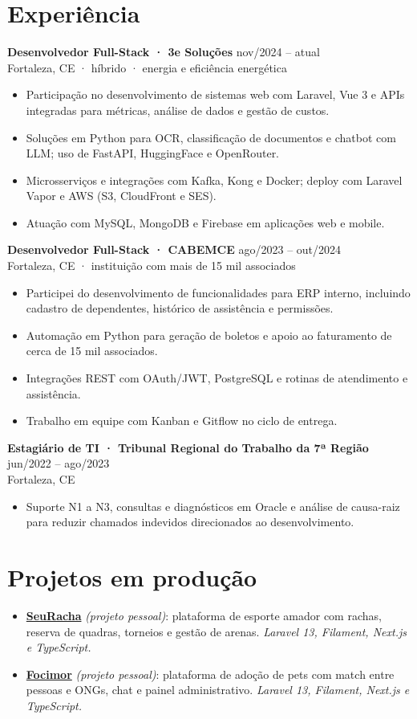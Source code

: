 \documentclass[10pt,a4paper]{article}
\newcommand{\job}[3]{\textbf{#1} \hfill {\color{muted}\small #3}\\{\color{muted}#2}\par\vspace{-2pt}}
\newcommand{\link}[2]{\href{#1}{\color{accent}#2}}
\begin{document}
\section{Experiência}
\job{Desenvolvedor Full-Stack · 3e Soluções}{Fortaleza, CE · híbrido · energia e eficiência energética}{nov/2024 -- atual}
\begin{itemize}
  \item Participação no desenvolvimento de sistemas web com Laravel, Vue 3 e APIs integradas para métricas, análise de dados e gestão de custos.
  \item Soluções em Python para OCR, classificação de documentos e chatbot com LLM; uso de FastAPI, HuggingFace e OpenRouter.
  \item Microsserviços e integrações com Kafka, Kong e Docker; deploy com Laravel Vapor e AWS (S3, CloudFront e SES).
  \item Atuação com MySQL, MongoDB e Firebase em aplicações web e mobile.
\end{itemize}

\job{Desenvolvedor Full-Stack · CABEMCE}{Fortaleza, CE · instituição com mais de 15 mil associados}{ago/2023 -- out/2024}
\begin{itemize}
  \item Participei do desenvolvimento de funcionalidades para ERP interno, incluindo cadastro de dependentes, histórico de assistência e permissões.
  \item Automação em Python para geração de boletos e apoio ao faturamento de cerca de 15 mil associados.
  \item Integrações REST com OAuth/JWT, PostgreSQL e rotinas de atendimento e assistência.
  \item Trabalho em equipe com Kanban e Gitflow no ciclo de entrega.
\end{itemize}

\job{Estagiário de TI · Tribunal Regional do Trabalho da 7ª Região}{Fortaleza, CE}{jun/2022 -- ago/2023}
\begin{itemize}
  \item Suporte N1 a N3, consultas e diagnósticos em Oracle e análise de causa-raiz para reduzir chamados indevidos direcionados ao desenvolvimento.
\end{itemize}

\section{Projetos em produção}
\begin{itemize}
  \item \textbf{\link{https://seuracha.aragaolabs.com.br}{SeuRacha}} \textit{(projeto pessoal)}: plataforma de esporte amador com rachas, reserva de quadras, torneios e gestão de arenas. \emph{Laravel 13, Filament, Next.js e TypeScript.}
  \item \textbf{\link{https://focimor.aragaolabs.com.br}{Focimor}} \textit{(projeto pessoal)}: plataforma de adoção de pets com match entre pessoas e ONGs, chat e painel administrativo. \emph{Laravel 13, Filament, Next.js e TypeScript.}
\end{itemize}
\end{document}
